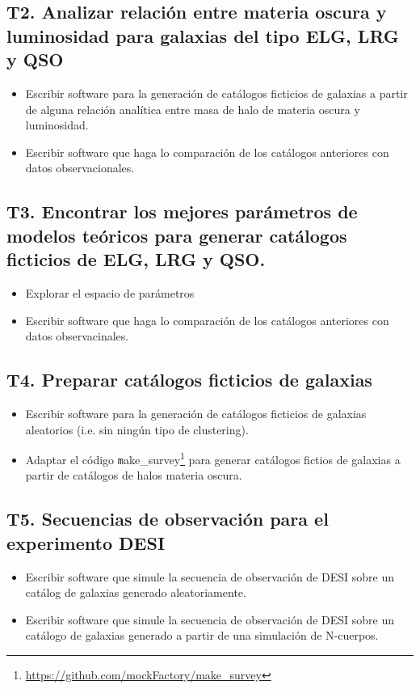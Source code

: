 \subsection*{T2. Analizar relaci\'on entre materia oscura y luminosidad para galaxias del tipo ELG, LRG y QSO}
\begin{itemize}
\item[T2.1] \gradA\prof 
  Escribir software para la generaci\'on de cat\'alogos
  ficticios de galaxias a partir de alguna relaci\'on anal\'itica
  entre masa de halo de materia oscura y luminosidad.
\item[T2.2] \gradA\prof 
  Escribir software que haga lo comparaci\'on de los cat\'alogos
  anteriores con datos observacionales.
\end{itemize}

\subsection*{T3. Encontrar los mejores par\'ametros de modelos
  te\'oricos para generar cat\'alogos ficticios de ELG, LRG y QSO.}
\begin{itemize}
\item[T3.1] \gradA\prof  
  Explorar el espacio de par\'ametros 
\item[T3.2] \gradA\prof  
  Escribir software que haga lo comparaci\'on
  de los cat\'alogos anteriores con datos observacinales.
\end{itemize}


\subsection*{T4. Preparar cat\'alogos ficticios de galaxias}
\begin{itemize}
\item[T4.1] \gradA\prof Escribir software para la generaci\'on de cat\'alogos
  ficticios de galaxias aleatorios (i.e. sin ning\'un tipo de
  clustering). 
\item[T4.2] \gradA\prof Adaptar el c\'odigo {\texttt
  make\_survey}\footnote{\url{https://github.com/mockFactory/make_survey}}
  para generar  cat\'alogos fictios de galaxias a partir de
  cat\'alogos de halos materia oscura. 
\end{itemize}

\subsection*{T5. Secuencias de observaci\'on para el experimento DESI}
\begin{itemize}
\item[T5.1] \prof Escribir software que simule la secuencia de observaci\'on
  de DESI sobre un cat\'alog de galaxias generado aleatoriamente. 
\item[T5.2] \prof Escribir software que simule la secuencia de observaci\'on
  de DESI sobre un cat\'alogo de galaxias generado a partir de una
  simulaci\'on de N-cuerpos. 
\end{itemize}

